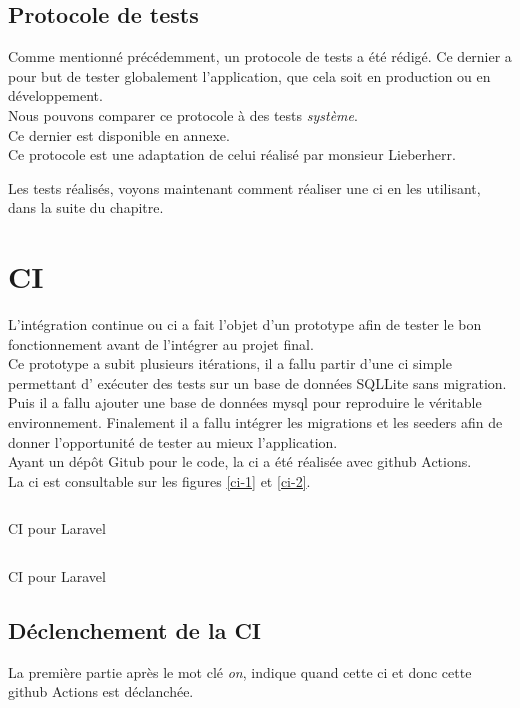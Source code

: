 \documentclass[
    iai, %
    il, %
]{heig-tb}
\begin{document}
\subsection{Protocole de tests}
Comme mentionné précédemment, un protocole de tests a été rédigé. Ce dernier a pour but de tester globalement l'application, que cela soit en production ou en développement. \\
Nous pouvons comparer ce protocole à des tests \emph{système}. \\
Ce dernier est disponible en annexe. \\
Ce protocole est une adaptation de celui réalisé par monsieur Lieberherr.

Les tests réalisés, voyons maintenant comment réaliser une \Gls{ci} en les utilisant, dans la suite du chapitre.

\section{CI}

L'intégration continue ou \Gls{ci} a fait l'objet d'un prototype afin de tester le bon fonctionnement
avant de l'intégrer au projet final.\\
Ce prototype a subit plusieurs itérations, il a fallu partir d'une \Gls{ci} simple permettant d'
exécuter des tests sur un base de données SQLLite sans migration. Puis il a fallu ajouter une base
de données \Gls{mysql} pour reproduire le véritable environnement. Finalement il a fallu intégrer les migrations et les seeders afin de donner l'opportunité de tester au mieux l'application.\\
Ayant un dépôt Gitub pour le code, la \Gls{ci} a été réalisée avec \Gls{github} Actions.\\
La \Gls{ci} est consultable sur les figures \ref{ci-1} et \ref{ci-2}.

\begin{listing}[h]
    \inputminted{yaml}{assets/code/ci-1.yml}
    \caption{CI pour Laravel \label{ci-1}}
\end{listing}

\begin{listing}[h]
    \inputminted{yaml}{assets/code/ci-2.yml}
    \caption{CI pour Laravel \label{ci-2}}
\end{listing}

\subsection{Déclenchement de la CI}
La première partie après le mot clé \emph{on}, indique quand cette \Gls{ci} et donc cette \Gls{github} Actions est déclanchée.
\end{document}
